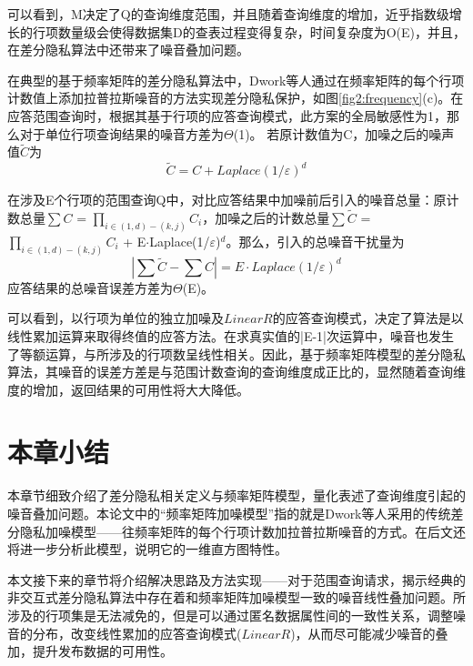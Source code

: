 可以看到，M决定了Q的查询维度范围，并且随着查询维度的增加，近乎指数级增长的行项数量级会使得数据集D的查表过程变得复杂，时间复杂度为O(E)，并且，在差分隐私算法中还带来了噪音叠加问题。

在典型的基于频率矩阵的差分隐私算法中\supercite{Dwork Calibrating}，Dwork等人通过在频率矩阵的每个行项计数值上添加拉普拉斯噪音的方法实现差分隐私保护，如图\ref{fig2:frequency}(c)。在应答范围查询时，根据其基于行项的应答查询模式，此方案的全局敏感性为1，那么对于单位行项查询结果的噪音方差为$\Theta$(1)。
若原计数值为C，加噪之后的噪声值$\tilde{C}$为
\[
\tilde{C} = C + Laplace(1/\varepsilon)^d
\]

在涉及E个行项的范围查询Q中，对比应答结果中加噪前后引入的噪音总量：原计数总量$\sum{C}$ = \(\prod\nolimits_{i \in (1,d) - (k,j)} {C{_i}} \)，加噪之后的计数总量$\sum{\tilde{C}}$ = \(\prod\nolimits_{i \in (1,d) - (k,j)} {C{_i}} \) + E$\cdotp$Laplace(1/$\varepsilon$)$^d$。那么，引入的总噪音干扰量为
\[
|\sum{\tilde{C}} - \sum{C}| = E \cdotp Laplace(1/\varepsilon)^d
\]
应答结果的总噪音误差方差为$\Theta$(E)。

可以看到，以行项为单位的独立加噪及$LinearR$的应答查询模式，决定了算法是以线性累加运算来取得终值的应答方法。在求真实值的|E-1|次运算中，噪音也发生了等额运算，与所涉及的行项数呈线性相关。因此，基于频率矩阵模型的差分隐私算法，其噪音的误差方差是与范围计数查询的查询维度成正比的，显然随着查询维度的增加，返回结果的可用性将大大降低。

\section{本章小结}

本章节细致介绍了差分隐私相关定义与频率矩阵模型，量化表述了查询维度引起的噪音叠加问题。本论文中的“频率矩阵加噪模型”指的就是Dwork等人采用的传统差分隐私加噪模型——往频率矩阵的每个行项计数加拉普拉斯噪音的方式。在后文还将进一步分析此模型，说明它的一维直方图特性。

本文接下来的章节将介绍解决思路及方法实现——对于范围查询请求，揭示经典的非交互式差分隐私算法中存在着和频率矩阵加噪模型一致的噪音线性叠加问题。所涉及的行项集是无法减免的，但是可以通过匿名数据属性间的一致性关系，调整噪音的分布，改变线性累加的应答查询模式($LinearR$)，从而尽可能减少噪音的叠加，提升发布数据的可用性。


